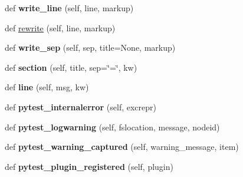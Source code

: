 \begin{DoxyCompactItemize}
\item 
\mbox{\label{class__pytest_1_1terminal_1_1_terminal_reporter_a4009f1bdcc77973ab351be92b135601f}} 
def {\bfseries write\+\_\+line} (self, line, markup)
\item 
def \hyperlink{class__pytest_1_1terminal_1_1_terminal_reporter_a3121b9c308199a14803ffbf1182f2e90}{rewrite} (self, line, markup)
\item 
\mbox{\label{class__pytest_1_1terminal_1_1_terminal_reporter_a60eb645e6c6951d938f44f6d7f3cfdd8}} 
def {\bfseries write\+\_\+sep} (self, sep, title=None, markup)
\item 
\mbox{\label{class__pytest_1_1terminal_1_1_terminal_reporter_a31f281c3af5220b67e3f87d383de24e2}} 
def {\bfseries section} (self, title, sep=\char`\"{}=\char`\"{}, kw)
\item 
\mbox{\label{class__pytest_1_1terminal_1_1_terminal_reporter_a691ee2d424ada6b3c11a097c1213b583}} 
def {\bfseries line} (self, msg, kw)
\item 
\mbox{\label{class__pytest_1_1terminal_1_1_terminal_reporter_a2d7267d8945ec1f88904fbb2d0249f6f}} 
def {\bfseries pytest\+\_\+internalerror} (self, excrepr)
\item 
\mbox{\label{class__pytest_1_1terminal_1_1_terminal_reporter_a719dcc92e53a432432946005e3f02d4b}} 
def {\bfseries pytest\+\_\+logwarning} (self, fslocation, message, nodeid)
\item 
\mbox{\label{class__pytest_1_1terminal_1_1_terminal_reporter_a286a3a1ec4fed0facc0060473b04449f}} 
def {\bfseries pytest\+\_\+warning\+\_\+captured} (self, warning\+\_\+message, item)
\item 
\mbox{\label{class__pytest_1_1terminal_1_1_terminal_reporter_afe721ffc6b3baafe6cfe0508a705e1b4}} 
def {\bfseries pytest\+\_\+plugin\+\_\+registered} (self, plugin)

\end{DoxyCompactItemize}
